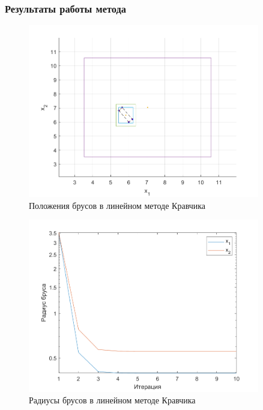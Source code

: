 \subsubsection{Результаты работы метода}
\begin{figure}[H]
\centering
\includegraphics[width=0.9\textwidth]{Graphics/Linear_boxes.png}
\caption{Положения брусов в линейном методе Кравчика} 
\end{figure}
\begin{figure}[H]
\centering
\includegraphics[width=0.9\textwidth]{Graphics/Linear_bar_rad.png}
\caption{Радиусы брусов в линейном методе Кравчика} 
\end{figure}
